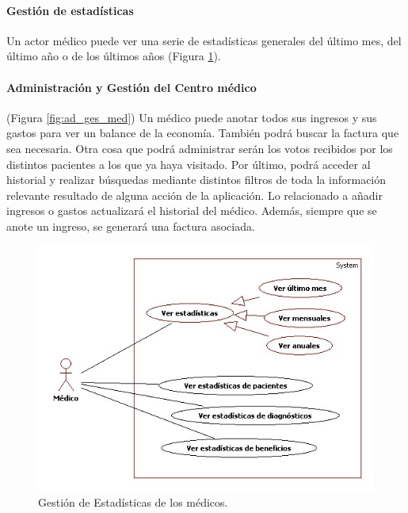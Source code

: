 \documentclass[a4paper,oneside,11pt]{book}
\begin{document}
			\paragraph{Gestión de estadísticas} %
			\label{par:gestion_de_estadisticas}
				Un actor médico puede ver una serie de estadísticas generales del último mes, del último año o de los últimos años (Figura \ref{fig:estad_med}). 
				
			
			
			\paragraph{Administración y Gestión del Centro médico} %
			\label{par:administracion_y_gestion_del_centro_medico}
				
				(Figura \ref{fig:ad_ges_med}) Un médico puede anotar todos sus ingresos y sus gastos para ver un balance de la economía. También podrá buscar la factura que sea necesaria. Otra cosa que podrá administrar serán los votos recibidos por los distintos pacientes a los que ya haya visitado. Por último, podrá acceder al historial y realizar búsquedas mediante distintos filtros de toda la información relevante resultado de alguna acción de la aplicación. Lo relacionado a añadir ingresos o gastos actualizará el historial del médico. Además, siempre que se anote un ingreso, se generará una factura asociada.
				
				\begin{figure}[H]
				  \centering
				    \includegraphics[width=12cm]{img/jpg/casos_uso/Estadisticas.jpg}
				  \caption{Gestión de Estadísticas de los médicos.}
				  \label{fig:estad_med}
				\end{figure}
				
\end{document}
